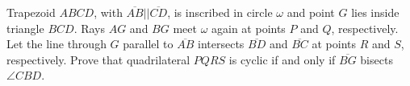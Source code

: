 Trapezoid $ ABCD$,  with $ \overline{AB}||\overline{CD}$,  is inscribed in circle $ \omega$ and point $ G$ lies inside triangle $ BCD$.  Rays $ AG$ and $ BG$ meet $ \omega$ again at points $ P$ and $ Q$,  respectively.  Let the line through $ G$ parallel to $ \overline{AB}$ intersects $ \overline{BD}$ and $ \overline{BC}$ at points $ R$ and $ S$,  respectively.  Prove that quadrilateral $ PQRS$ is cyclic if and only if $ \overline{BG}$ bisects $ \angle CBD$.